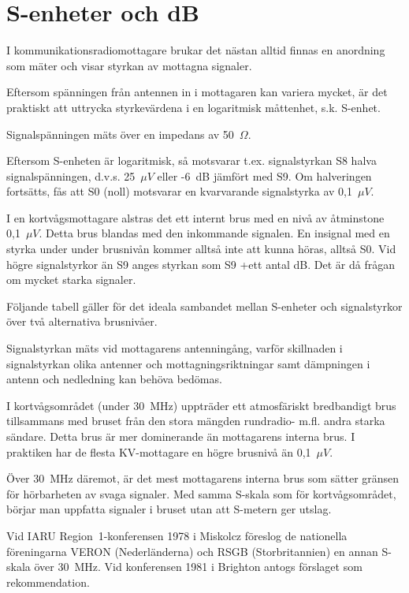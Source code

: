 \chapter{S-enheter och dB}
\label{s-enhet}

I kommunikationsradiomottagare brukar det nästan alltid finnas en
anordning som mäter och visar styrkan av mottagna signaler.

Eftersom spänningen från antennen in i mottagaren kan variera mycket, är det
praktiskt att uttrycka styrkevärdena i en logaritmisk måttenhet, s.k. S-enhet.

Signalspänningen mäts över en impedans av 50~\(\Omega\).

Eftersom S-enheten är logaritmisk, så motsvarar t.ex. signalstyrkan
S8 halva signalspänningen, d.v.s. 25~\(\mu V\) eller -6~dB jämfört med S9.
Om halveringen fortsätts, fås att S0 (noll) motsvarar en kvarvarande
signalstyrka av 0,1~\(\mu V\).

I en kortvågsmottagare alstras det ett internt brus med en nivå av
åtminstone 0,1~\(\mu V\).
Detta brus blandas med den inkommande signalen.
En insignal med en styrka under under brusnivån kommer alltså inte att
kunna höras, alltså S0.
Vid högre signalstyrkor än S9 anges styrkan som S9 +ett antal dB.
Det är då frågan om mycket starka signaler.

Följande tabell gäller för det ideala sambandet mellan S-enheter och
signalstyrkor över två alternativa brusnivåer.

Signalstyrkan mäts vid mottagarens antenningång, varför skillnaden i
signalstyrkan olika antenner och mottagningsriktningar samt dämpningen
i antenn och nedledning kan behöva bedömas.

I kortvågsområdet (under 30~MHz) uppträder ett atmosfäriskt bredbandigt brus
tillsammans med bruset från den stora mängden rundradio- m.fl. andra starka
sändare.
Detta brus är mer dominerande än mottagarens interna brus.
I praktiken har de flesta KV-mottagare en högre brusnivå än 0,1~\(\mu V\).

Över 30~MHz däremot, är det mest mottagarens interna brus som sätter
gränsen för hörbarheten av svaga signaler.
Med samma S-skala som för kortvågsområdet, börjar man uppfatta signaler i
bruset utan att S-metern ger utslag.

Vid IARU Region~1-konferensen 1978 i Miskolcz föreslog de nationella
föreningarna VERON (Nederländerna) och RSGB (Storbritannien) en annan
S-skala över 30~MHz.
Vid konferensen 1981 i Brighton antogs förslaget som rekommendation.

